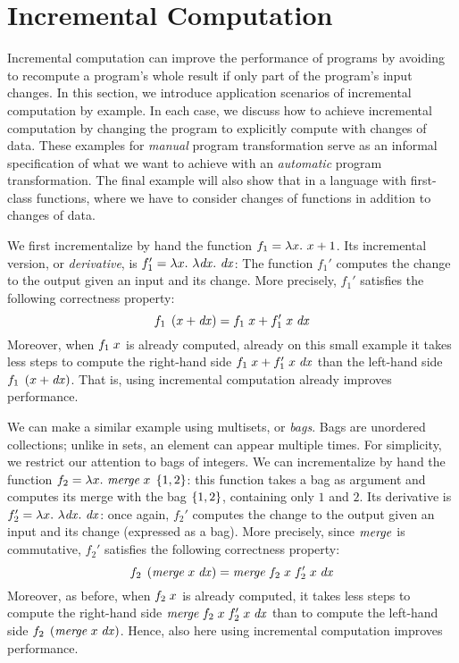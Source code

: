 \section{Incremental Computation}
\label{sec:informal}

Incremental computation can improve the performance of programs
by avoiding to recompute a program's whole result if only part of
the program's input changes. In this section, we introduce
application scenarios of incremental computation by example. In
each case, we discuss how to achieve incremental computation
by changing the program to explicitly compute with changes of
data. These examples for \emph{manual} program transformation
serve as an informal specification of what we want to achieve
with an \emph{automatic} program transformation. The final
example will also show that in a language with first-class
functions, where we have to consider changes of functions in addition
to changes of data.

We first incrementalize by hand the function $f_1 =
\Lam{x}{\Add{x}{1}}$. Its incremental version, or
\emph{derivative}, is $f_1' = \Lam{x}{\Lam{\D x}{\D x}}$: The function
$f_1'$ computes the change to the output given an input and its
change. More precisely, $f_1'$ satisfies the following correctness
property:
\[
\App{f_1}{\Add*{x}{\D x}} = \Add{\App{f_1}{x}}{\App{\App{f_1'}{x}}{\D x}}
\]
Moreover, when $\App{f_1}{x}$ is already computed, already on this
small example it takes less steps to compute the right-hand side
$\Add{\App{f_1}{x}}{\App{\App{f_1'}{x}}{\D x}}$ than the left-hand side
$\App{f_1}{\Add*{x}{\D x}}$. That is, using incremental computation
already improves performance.

We can make a similar example using multisets, or \emph{bags}.
Bags are unordered collections; unlike in sets, an element can
appear multiple times.
%
For simplicity, we restrict
our attention to bags of integers.
%
We can incrementalize by hand the function
$f_2 = \Lam{x}{\Merge{x}{\BagLit{1, 2}}}$:
%
this function takes a bag as argument and computes its merge with
the bag $\left\lbrace1, 2\right\rbrace$, containing only
$1$ and $2$. Its derivative is $f_2' = \Lam{x}{\Lam{\D x}{\D x}}$: once
again, $f_2'$ computes the change to the output given an input and
its change (expressed as a bag). More precisely, since $\mathit{merge}$
is commutative, $f_2'$ satisfies the following correctness
property:
\[
\App{f_2}{\Merge*{x}{\D x}} = \Merge{\App{f_2}{x}}{\App{\App{f_2'}{x}}{\D x}}
\]
Moreover, as before, when $\App{f_2}{x}$ is already computed, it
takes less steps to compute the right-hand side
$\Merge{\App{f_2}{x}}{\App{\App{f_2'}{x}}{\D x}}$ than to compute the left-hand side
$\App{f_2}{\Merge*{x}{\D x}}$. Hence, also here using incremental
computation improves performance.

